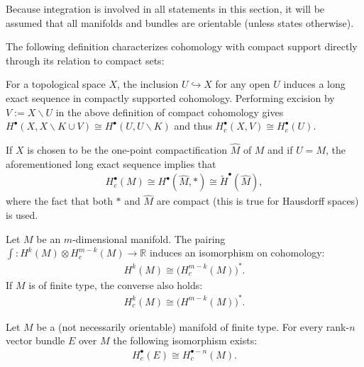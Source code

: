     Because integration is involved in all statements in this section, it will be assumed that all manifolds and bundles are orientable (unless states otherwise).

    The following definition characterizes cohomology with compact support directly through its relation to compact sets:
    \begin{property}\label{bundle:reduced_compact_cohomology}
        For a topological space $X$, the inclusion $U\hookrightarrow X$ for any open $U$ induces a long exact sequence in compactly supported cohomology. Performing excision by $V:=X\backslash U$ in the above definition of compact cohomology gives $H^\bullet(X,X\backslash K\cup V)\cong H^\bullet(U,U\backslash K)$ and thus $H^\bullet_c(X,V)\cong H^\bullet_c(U)$.

        If $X$ is chosen to be the one-point compactification $\widehat{M}$ of $M$ and if $U=M$, the aforementioned long exact sequence implies that
        \begin{gather}
            H^\bullet_c(M)\cong H^\bullet(\widehat{M}, \ast)\cong\widetilde{H}^\bullet(\widehat{M}),
        \end{gather}
        where the fact that both $\ast$ and $\widehat{M}$ are compact (this is true for Hausdorff spaces) is used.
    \end{property}

    \begin{theorem}\label{bundle:poincare_duality}
        Let $M$ be an $m$-dimensional manifold. The pairing $\int:H^k(M)\otimes H^{m-k}_c(M)\rightarrow\mathbb{R}$ induces an isomorphism on cohomology:
        \begin{gather}
            H^k(M)\cong\Big(H^{m-k}_c(M)\Big)^*.
        \end{gather}
        If $M$ is of finite type, the converse also holds:
        \begin{gather}
            H^k_c(M)\cong\Big(H^{m-k}(M)\Big)^*.
        \end{gather}
    \end{theorem}
    \begin{result}
        Let $M$ be a (not necessarily orientable) manifold of finite type. For every rank-$n$ vector bundle $E$ over $M$ the following isomorphism exists:
        \begin{gather}
            H^\bullet_c(E)\cong H^{\bullet-n}_c(M).
        \end{gather}
    \end{result}


